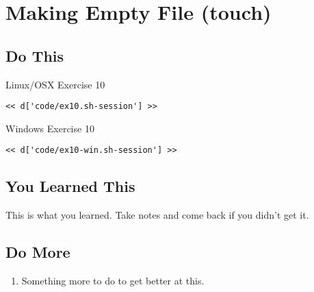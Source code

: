 \chapter{Making Empty File (touch)}

\section{Do This}

\begin{code}{Linux/OSX Exercise 10}
\begin{Verbatim}
<< d['code/ex10.sh-session'] >>
\end{Verbatim}
\end{code}

\begin{code}{Windows Exercise 10}
\begin{Verbatim}
<< d['code/ex10-win.sh-session'] >>
\end{Verbatim}
\end{code}

\section{You Learned This}

This is what you learned.  Take notes and come back if you didn't get it.

\section{Do More}

\begin{enumerate}
\item Something more to do to get better at this.
\end{enumerate}

